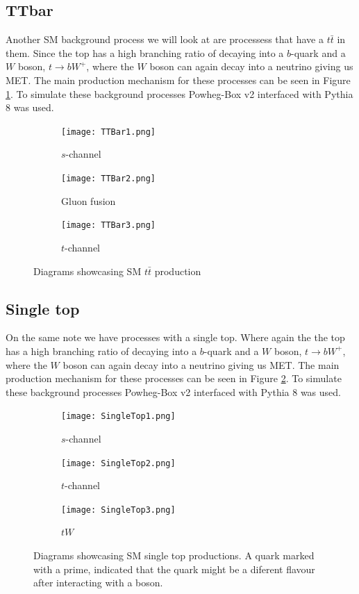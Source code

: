 \documentclass[12pt, a4paper]{book}
\begin{document}
\subsection{TTbar}
Another SM background process we will look at are processess that have a $t\bar{t}$ in them. Since the top has a high branching ratio of decaying into a $b$-quark and a $W$ boson, $t\rightarrow bW^+$, where the $W$ boson can again decay into a neutrino giving 
us MET. The main production mechanism for these processes can be seen in Figure \ref{fig:TT_BKG}. To simulate these background processes Powheg-Box v2 \cite{PowHeg} interfaced with Pythia 8 \cite{Pythia} was used.
\begin{figure}[!ht]
    \centering
    \begin{subfigure}[b]{0.3\textwidth}
        \centering
        \texttt{[image: TTBar1.png]}
        \caption{$s$-channel}
    \end{subfigure}
    \hfill
    \begin{subfigure}[b]{0.3\textwidth}
        \centering
        \texttt{[image: TTBar2.png]}
        \caption{Gluon fusion}
    \end{subfigure}
    \hfill
    \begin{subfigure}[b]{0.3\textwidth}
        \centering
        \texttt{[image: TTBar3.png]}
        \caption{$t$-channel}
    \end{subfigure}
    \caption[$t\bar{t}$ production]{Diagrams showcasing SM $t\bar{t}$ production}\label{fig:TT_BKG}
\end{figure}

\subsection{Single top}
On the same note we have processes with a single top. Where again the the top has a high branching ratio of decaying into a $b$-quark and a $W$ boson, $t\rightarrow bW^+$, where the $W$ boson can again decay into a neutrino giving 
us MET. The main production mechanism for these processes can be seen in Figure \ref{fig:T_BKG}. To simulate these background processes Powheg-Box v2 \cite{PowHeg} interfaced with Pythia 8 \cite{Pythia} was used.
\begin{figure}[!ht]
    \centering
    \begin{subfigure}[b]{0.3\textwidth}
        \centering
        \texttt{[image: SingleTop1.png]}
        \caption{$s$-channel}
    \end{subfigure}
    \hfill
    \begin{subfigure}[b]{0.3\textwidth}
        \centering
        \texttt{[image: SingleTop2.png]}
        \caption{$t$-channel}
    \end{subfigure}
    \hfill
    \begin{subfigure}[b]{0.3\textwidth}
        \centering
        \texttt{[image: SingleTop3.png]}
        \caption{$tW$}
    \end{subfigure}
    \caption[Single Top production]{Diagrams showcasing SM single top productions.  A quark marked with a prime, indicated that the quark might be a diferent flavour after interacting with a boson.}\label{fig:T_BKG}
\end{figure}
\end{document}
